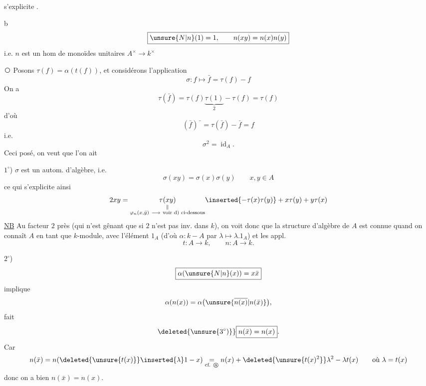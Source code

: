   s'explicite .

\textcircled{b}
\[
 \boxed{\unsure{N|n}(1)=1,\qquad n(xy)=n(x)n(y)}
\]
i.e. $n$ est un hom de monoïdes unitaires $A^\times\longrightarrow k^\times$

\textcircled{}
Posons $\tau(f)=\alpha(t(f))$, et considérons l'application
\[
 \sigma:f\longmapsto\bar f=\tau(f)-f
\]
On a
\[
 \tau(\bar f)=\tau(f)\underbrace{\tau(1)}_{2}-\tau(f)=\tau(f)
\]
d'où
\[
 (\bar f)\bar{\phantom f}=\tau(\bar f)-\bar f=f
\]
i.e. 
\[
 \sigma^2=\operatorname{id}_A.
\]
Ceci posé, on veut que l'on ait

\uline{$1^\circ$}) $\sigma$ est un autom. d'algèbre, i.e.
\[
 \boxed{\sigma(xy)=\sigma(x)\sigma(y)}\qquad x,y\in A
\]
ce qui s'explicite ainsi
\[
 2xy=\underset{\substack{\Vert\\\varphi_n(x,\bar y)\ \longrightarrow\ \text{voir d) ci-dessous}}}{\tau(xy)}\inserted{-\tau(x)\tau(y)}+x\tau(y)+y\tau(x)
\]
\uline{NB} Au facteur $2$ près (qui n'est gênant que  si $2$ n'est pas inv. dans $k$), on voit donc que la structure d'algèbre de $A$ est connue quand on connaît $A$ en tant que $k$-module, avec l'élément $1_A$ (d'où $\alpha:k\mathrel{-}A$ par $\lambda\mapsto\lambda.1_A$) et les appl.
\[
 t:A\longrightarrow k,\qquad n:A\longrightarrow k.
\]

$2^\circ$)
\[
 \boxed{\alpha(\unsure{N|n}(x))=x\bar x}
\]
implique
\[
 \alpha(n(x))=\alpha\bigl(\unsure{\overline{n(x)}|n(\bar x)}\bigr),
\]
  fait
\[
 \deleted{\unsure{3^\circ)}}\boxed{n(\bar x)=n(x)}.
\]
Car
\[
 n(\bar x)=n(\deleted{\unsure{t(x)}}\inserted{\lambda}1-x)
 \underset{\text{cf. \textcircled{a}}}{=}
 n(x)+\deleted{\unsure{t(x)^2}}\lambda^2-\lambda t(x)
 \qquad\text{où }\lambda=t(x)
\]
donc on a bien $n(\bar x)=n(x)$.
